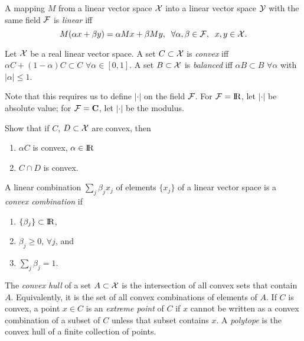 \begin{Definition}
        A mapping $M$ from a linear vector space ${\cal X}$ into a linear vector space ${\cal Y}$
        with the same field ${\cal F}$ is {\em linear\/} iff
        \[
                M(\alpha x + \beta y) = \alpha M x + \beta M y, \;\; \forall \alpha, \beta \in {\cal F},
                \;\;x, y \in {\cal X}.
        \]
\end{Definition}

\begin{Definition}
        Let ${\cal X}$ be a real linear vector space. A set $C \subset {\cal X}$ is {\em convex\/}
        iff $\alpha C + (1-\alpha)C \subset C$ $\forall \alpha \in [0, 1]$.
        A set $B \subset {\cal X}$ is {\em balanced\/}
        iff $\alpha B \subset B$ $\forall \alpha$ with $|\alpha| \le 1$.
\end{Definition}
Note that this requires us to define $|\cdot |$ on the field ${\cal F}$.
For ${\cal F} = \hbox{I\kern-.17em\hbox{R}}$, let $|\cdot |$ be absolute value; for ${\cal F} = {\bf C}$, let $|\cdot|$ be
the modulus.

\begin{Exercise}
        Show that if $C$, $D \subset {\cal X}$ are convex, then
        \begin{enumerate}
                \item $\alpha C$ is convex, $\alpha \in \hbox{I\kern-.17em\hbox{R}}$
                \item $C \cap D$ is convex.
        \end{enumerate}
\end{Exercise}


\begin{Definition}
        A linear combination $\sum_j \beta_j x_j$ of elements $\{x_j\}$
        of a linear vector space is a {\em convex combination\/} if
        \begin{enumerate}
                \item $\{ \beta_j \} \subset \hbox{I\kern-.17em\hbox{R}}$,
                \item $\beta_j \ge 0$, $\forall j$, and
                \item $\sum_j \beta_j = 1$.
        \end{enumerate}
\end{Definition}


\begin{Definition}
        The {\em convex hull\/} of a set $A \subset {\cal X}$ is the intersection of
        all convex sets that contain $A$.
        Equivalently, it is the set of all convex combinations of elements of $A$.
        If $C$ is convex, a point $x \in C$ is an {\em extreme point\/} of $C$ if $x$
        cannot be written as a convex combination of a subset of $C$ unless that subset
        contains $x$.
        A {\em polytope\/} is the convex hull of a finite collection of points.
\end{Definition}


